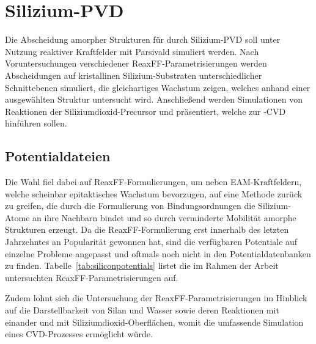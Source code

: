 \section{Silizium-PVD}
\label{siliconpvd}

Die Abscheidung amorpher Strukturen für durch Silizium-PVD soll unter Nutzung reaktiver Kraftfelder mit Parsivald simuliert werden.
Nach Voruntersuchungen verschiedener ReaxFF-Para\-metrisierungen werden Abscheidungen auf kristallinen Silizium-Substraten unterschiedlicher Schnittebenen simuliert, die gleichartiges Wachstum zeigen, welches anhand einer ausgewählten Struktur untersucht wird.
Anschließend werden Simulationen von Reaktionen der Siliziumdioxid-Precursor  und  präsentiert, welche zur -CVD hinführen sollen.

\subsection{Potentialdateien}

Die Wahl fiel dabei auf ReaxFF-Formulierungen, um neben EAM-Kraftfeldern, welche scheinbar epitaktisches Wachstum bevorzugen, auf eine Methode zurück zu greifen, die durch die Formulierung von Bindungsordnungen die Silizium-Atome an ihre Nachbarn bindet und so durch verminderte Mobilität amorphe Strukturen erzeugt.
Da die ReaxFF-Formulierung erst innerhalb des letzten Jahrzehntes an Popularität gewonnen hat, sind die verfügbaren Potentiale auf einzelne Probleme angepasst und oftmals noch nicht in den Potentialdatenbanken zu finden.
Tabelle~\ref{tab:siliconpotentials} listet die im Rahmen der Arbeit untersuchten ReaxFF-Parametrisierungen auf.

Zudem lohnt sich die Untersuchung der ReaxFF-Parametrisierungen im Hinblick auf die Darstellbarkeit von Silan und Wasser sowie deren Reaktionen mit einander und mit Siliziumdioxid-Oberflächen, womit die umfassende Simulation eines CVD-Prozesses ermöglicht würde.


